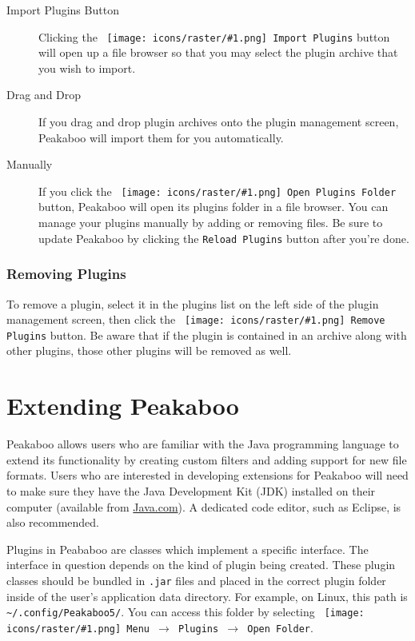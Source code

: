 \documentclass[article,twoside,11pt]{report}
\newcommand{\command}[1]{\texttt{#1}}
\newcommand{\icon}[1]{\texttt{[image: icons/raster/\#1.png]}}
\newcommand{\button}[2]{\ \command{\icon{#1} #2}}
\newcommand{\menu}[0]{$\rightarrow$}
\newcommand{\file}[1]{\command{#1}}
\newcommand{\tocsubsection}[1]{\subsection*{#1}\addcontentsline{toc}{subsection}{#1}}
\begin{document}
\begin{description}

\item [Import Plugins Button] Clicking the \button{edit-add}{Import Plugins} button will open up a file browser so that you may select the plugin archive that you wish to import. 

\item [Drag and Drop] If you drag and drop plugin archives onto the plugin management screen, Peakaboo will import them for you automatically.

\item [Manually] If you click the \button{document-open}{Open Plugins Folder} button, Peakaboo will open its plugins folder in a file browser. You can manage your plugins manually by adding or removing files. Be sure to update Peakaboo by clicking the \command{Reload Plugins} button after you're done.

\end{description}

\tocsubsection{Removing Plugins}

To remove a plugin, select it in the plugins list on the left side of the plugin management screen, then click the \button{edit-remove}{Remove Plugins} button. Be aware that if the plugin is contained in an archive along with other plugins, those other plugins will be removed as well.

\cleardoublepage
\appendix

\chapter{Extending Peakaboo}

Peakaboo allows users who are familiar with the Java programming language to extend its functionality by creating custom filters and adding support for new file formats. Users who are interested in developing extensions for Peakaboo will need to make sure they have the Java Development Kit (JDK) installed on their computer (available from \href{http://java.com}{Java.com}). A dedicated code editor, such as Eclipse, is also recommended. 

Plugins in Peababoo are classes which implement a specific interface. The interface in question depends on the kind of plugin being created. These plugin classes should be bundled in \file{.jar} files and placed in the correct plugin folder inside of the user's application data directory. For example, on Linux, this path is \file{\textasciitilde/.config/Peakaboo5/}. You can access this folder by selecting \command{\button{main-menu}{Menu} \menu\ Plugins \menu\ Open Folder}.
\end{document}
